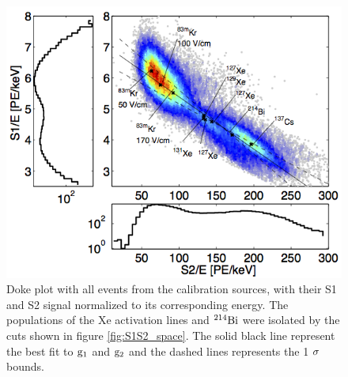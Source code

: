 \renewcommand{\baselinestretch}{1}
\small\normalsize
 \begin{figure}[h!]\centering
\includegraphics[width=130mm]{Chapter_E_Scale/Figures/Doke_new/CD.png}
\caption{Doke plot with all events from the calibration sources, with their S1 and S2 signal normalized to its corresponding energy. The populations of the Xe activation lines and $\rm ^{214}Bi$ were isolated by the cuts shown in figure \ref{fig:S1S2_space}. The solid black line represent the best fit to $\rm g_1$ and $\rm g_2$ and the dashed lines represents the 1 $\rm \sigma$ bounds.}
\label{fig:Doke1_Den}
\end{figure}
\renewcommand{\baselinestretch}{2}
\small\normalsize

\newpage

